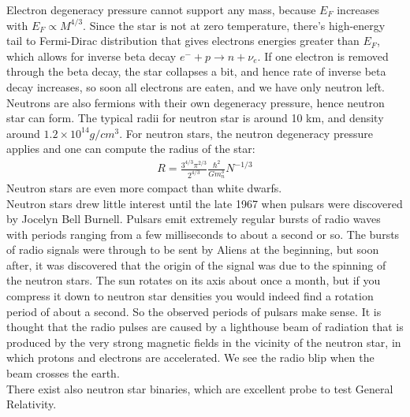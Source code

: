 \documentclass[11pt]{article}
\theoremstyle{break}
\theoremstyle{break}
\begin{document}
Electron degeneracy pressure cannot support any mass, because $E_F$ increases with  $E_F \propto M^{4/3}$. Since the star is not at zero temperature, there's high-energy tail to Fermi-Dirac distribution that gives electrons energies greater than $E_F$, which allows for inverse beta decay $e^- + p \to n + \nu_e$. If one electron is removed through the beta decay, the star collapses a bit, and hence rate of inverse beta decay increases, so soon all electrons are eaten, and we have only neutron left. Neutrons are also fermions with their own degeneracy pressure, hence neutron star can form. The typical radii for neutron star is around 10 km, and density around  $1.2 \times 10^{14} g/cm^3$. For neutron stars, the neutron degeneracy pressure applies and one can compute the radius of the star:
\begin{align*}
R = \frac{3^{4/3}\pi^{2/3}}{2^{4/3}} \frac{\hbar^2}{Gm_n^3}N^{-1/3}
\end{align*}
Neutron stars are even more compact than white dwarfs.\\


Neutron stars drew little interest until the late 1967 when pulsars were
discovered by Jocelyn Bell Burnell. Pulsars emit extremely regular bursts of radio waves with periods ranging from a few milliseconds to about a second or so. The bursts of radio signals were through to be sent by Aliens at the beginning, but soon after, it was discovered that the origin of the signal was due to the spinning of the neutron stars. The sun rotates on its axis about once a month, but if you compress it down to neutron star densities you would indeed find a rotation period of about a second. So the observed periods of pulsars make sense. It is thought
that the radio pulses are caused by a lighthouse beam of radiation that is produced by the very strong magnetic fields in the vicinity of the neutron star, in which protons and electrons are accelerated. We see the radio blip when the beam crosses the earth. \\


There exist also neutron star binaries, which are excellent probe to test General Relativity.\\
\end{document}
